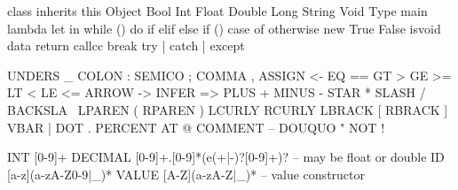 class inherits this
Object
Bool
Int
Float
Double
Long
String
Void
Type
main
lambda
let in
while () { } do
if elif else
if () { }
case of
otherwise
new
True
False
isvoid
data
return
callcc
break
try | catch | except

UNDERS  _
COLON   :
SEMICO  ;
COMMA   ,
ASSIGN  <-
EQ      ==
GT      >
GE      >=
LT      <
LE      <=
ARROW   ->
INFER   =>
PLUS    +
MINUS   -
STAR    *
SLASH   /
BACKSLA \
LPAREN  (
RPAREN  )
LCURLY  {
RCURLY  }
LBRACK  [
RBRACK  ]
VBAR    |
DOT     .
PERCENT %
AT      @
COMMENT --
DOUQUO  "
NOT     !


INT     [0-9]+
DECIMAL [0-9]+.[0-9]*(e(+|-)?[0-9]+)?   -- may be float or double
ID      [a-z](a-zA-Z0-9|_)*
VALUE   [A-Z](a-zA-Z|_)*  -- value constructor

